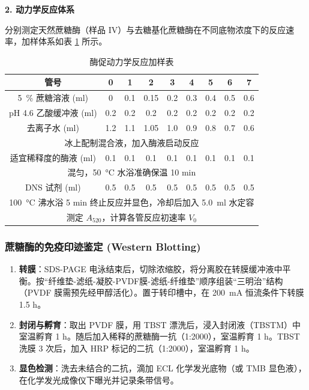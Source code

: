 \documentclass[10.5pt, a4paper]{ctexart}
\begin{document}
\textbf{2. 动力学反应体系}

分别测定天然蔗糖酶（样品 IV）与去糖基化蔗糖酶在不同底物浓度下的反应速率，加样体系如表 \ref{tab:kinetics_reaction} 所示。

\begin{table}[H]
    \centering
    \caption{酶促动力学反应加样表}
    \label{tab:kinetics_reaction}
    \begin{tabular}{ccccccccc}
        \toprule
        \textbf{管号} & \textbf{0} & \textbf{1} & \textbf{2} & \textbf{3} & \textbf{4} & \textbf{5} & \textbf{6} & \textbf{7} \\
        \midrule
        \SI{5}{\%} 蔗糖溶液 (ml) & 0 & 0.1 & 0.15 & 0.2 & 0.3 & 0.4 & 0.5 & 0.6 \\
        pH 4.6 乙酸缓冲液 (ml) & 0.2 & 0.2 & 0.2 & 0.2 & 0.2 & 0.2 & 0.2 & 0.2 \\
        去离子水 (ml) & 1.2 & 1.1 & 1.05 & 1.0 & 0.9 & 0.8 & 0.7 & 0.6 \\
        \midrule
        \multicolumn{9}{c}{冰上配制混合液，加入酶液启动反应} \\
        \midrule
        适宜稀释度的酶液 (ml) & 0.1 & 0.1 & 0.1 & 0.1 & 0.1 & 0.1 & 0.1 & 0.1 \\
        \midrule
        \multicolumn{9}{c}{混匀，\SI{50}{\celsius} 水浴准确保温 10 min} \\
        \midrule
        DNS 试剂 (ml) & 0.5 & 0.5 & 0.5 & 0.5 & 0.5 & 0.5 & 0.5 & 0.5 \\
        \midrule
        \multicolumn{9}{c}{\SI{100}{\celsius} 沸水浴 5 min 终止反应并显色，冷却后加入 \SI{5.0}{ml} 水定容} \\
        \multicolumn{9}{c}{测定 $A_{520}$，计算各管反应初速率 $V_0$} \\
        \bottomrule
    \end{tabular}
\end{table}

\subsubsection{蔗糖酶的免疫印迹鉴定 (Western Blotting)}

\begin{enumerate}
    \item \textbf{转膜}：SDS-PAGE 电泳结束后，切除浓缩胶，将分离胶在转膜缓冲液中平衡。按“纤维垫-滤纸-凝胶-PVDF膜-滤纸-纤维垫”顺序组装“三明治”结构（PVDF 膜需预先经甲醇活化）。置于转印槽中，在 \SI{200}{mA} 恒流条件下转膜 1.5 h。
    \item \textbf{封闭与孵育}：取出 PVDF 膜，用 TBST 漂洗后，浸入封闭液（TBSTM）中室温孵育 1 h。随后加入稀释的蔗糖酶一抗（1:2000），室温孵育 1 h。TBST 洗膜 3 次后，加入 HRP 标记的二抗（1:2000），室温孵育 1 h。
    \item \textbf{显色检测}：洗去未结合的二抗，滴加 ECL 化学发光底物（或 TMB 显色液），在化学发光成像仪下曝光并记录条带信号。
\end{enumerate}
\end{document}
